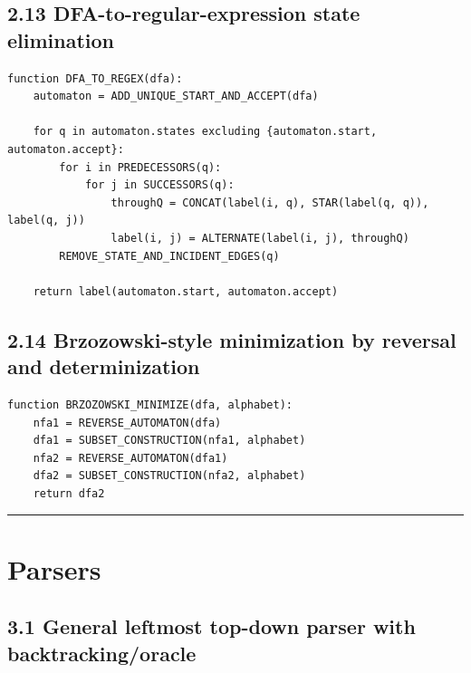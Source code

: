\documentclass[10pt,letterpaper]{article}
\begin{document}
\subsection*{2.13 DFA-to-regular-expression state elimination}
{}

\begin{verbatim}
function DFA_TO_REGEX(dfa):
    automaton = ADD_UNIQUE_START_AND_ACCEPT(dfa)

    for q in automaton.states excluding {automaton.start, automaton.accept}:
        for i in PREDECESSORS(q):
            for j in SUCCESSORS(q):
                throughQ = CONCAT(label(i, q), STAR(label(q, q)), label(q, j))
                label(i, j) = ALTERNATE(label(i, j), throughQ)
        REMOVE_STATE_AND_INCIDENT_EDGES(q)

    return label(automaton.start, automaton.accept)
\end{verbatim}

\subsection*{2.14 Brzozowski-style minimization by reversal and determinization}
{}

\begin{verbatim}
function BRZOZOWSKI_MINIMIZE(dfa, alphabet):
    nfa1 = REVERSE_AUTOMATON(dfa)
    dfa1 = SUBSET_CONSTRUCTION(nfa1, alphabet)
    nfa2 = REVERSE_AUTOMATON(dfa1)
    dfa2 = SUBSET_CONSTRUCTION(nfa2, alphabet)
    return dfa2
\end{verbatim}

\medskip\hrule\medskip

\clearpage
\section{Parsers}

\subsection*{3.1 General leftmost top-down parser with backtracking/oracle}
{}
\end{document}
